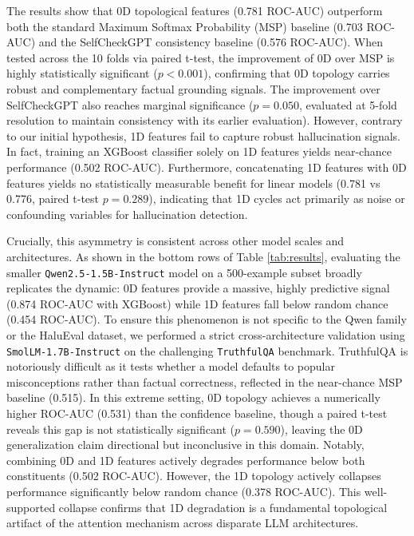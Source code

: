 \documentclass[11pt,a4paper]{article}
\begin{document}
The results show that 0D topological features (0.781 ROC-AUC) outperform both the standard Maximum Softmax Probability (MSP) baseline (0.703 ROC-AUC) and the SelfCheckGPT consistency baseline (0.576 ROC-AUC). When tested across the 10 folds via paired t-test, the improvement of 0D over MSP is highly statistically significant ($p < 0.001$), confirming that 0D topology carries robust and complementary factual grounding signals. The improvement over SelfCheckGPT also reaches marginal significance ($p = 0.050$, evaluated at 5-fold resolution to maintain consistency with its earlier evaluation). However, contrary to our initial hypothesis, 1D features fail to capture robust hallucination signals. In fact, training an XGBoost classifier solely on 1D features yields near-chance performance (0.502 ROC-AUC). Furthermore, concatenating 1D features with 0D features yields no statistically measurable benefit for linear models (0.781 vs 0.776, paired t-test $p = 0.289$), indicating that 1D cycles act primarily as noise or confounding variables for hallucination detection.

Crucially, this asymmetry is consistent across other model scales and architectures. As shown in the bottom rows of Table \ref{tab:results}, evaluating the smaller \texttt{Qwen2.5-1.5B-Instruct} model on a 500-example subset broadly replicates the dynamic: 0D features provide a massive, highly predictive signal (0.874 ROC-AUC with XGBoost) while 1D features fall below random chance (0.454 ROC-AUC). To ensure this phenomenon is not specific to the Qwen family or the HaluEval dataset, we performed a strict cross-architecture validation using \texttt{SmolLM-1.7B-Instruct} on the challenging \texttt{TruthfulQA} benchmark. TruthfulQA is notoriously difficult as it tests whether a model defaults to popular misconceptions rather than factual correctness, reflected in the near-chance MSP baseline (0.515). In this extreme setting, 0D topology achieves a numerically higher ROC-AUC (0.531) than the confidence baseline, though a paired t-test reveals this gap is not statistically significant ($p = 0.590$), leaving the 0D generalization claim directional but inconclusive in this domain. Notably, combining 0D and 1D features actively degrades performance below both constituents (0.502 ROC-AUC). However, the 1D topology actively collapses performance significantly below random chance (0.378 ROC-AUC). This well-supported collapse confirms that 1D degradation is a fundamental topological artifact of the attention mechanism across disparate LLM architectures.
\end{document}
